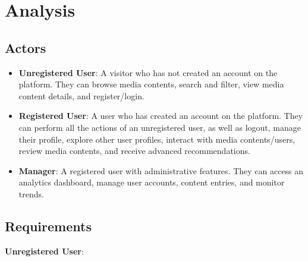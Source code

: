\chapter{Analysis}

\section {Actors}
\begin{itemize}
    \item \textbf{Unregistered User}: A visitor who has not created an account on the platform. They can browse media contents, search and filter, view media content details, and register/login.
    \item \textbf{Registered User}: A user who has created an account on the platform. They can perform all the actions of an unregistered user, as well as logout, manage their profile, explore other user profiles, interact with media contents/users, review media contents, and receive advanced recommendations.
    \item \textbf{Manager}: A registered user with administrative features. They can access an analytics dashboard, manage user accounts, content entries, and monitor trends.
\end{itemize}

\section{Requirements}
\textbf{Unregistered User}:

